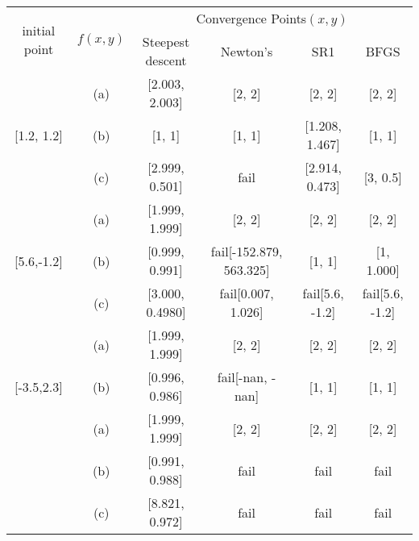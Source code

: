 \documentclass[../main.tex]{subfiles}
\begin{document}
\begin{center}
    \begin{tabular}{| c | c | c | c | c | c | } \hline
    \multirow{2}{*}{initial point}  & \multirow{2}{*}{$f(x, y)$}   & \multicolumn{4}{c|}{Convergence Points$(x, y)$} \\ \cline{3-6}
                                    &                              & Steepest descent & Newton's & SR1 & BFGS \\ \hline
    \multirow{3}{*}{[1.2, 1.2]}     & (a)                          & [2.003, 2.003]   & [2, 2]   & [2, 2] & [2, 2]  \\ 
                                    & (b)                          & [1, 1]           & [1, 1]   & [1.208, 1.467] & [1, 1] \\ 
                                    & (c)                          & [2.999, 0.501]   & fail     & [2.914, 0.473] & [3, 0.5]\\ \hline
    \multirow{3}{*}{[5.6,-1.2]}     & (a)                          & [1.999, 1.999]   & [2, 2] & [2, 2] & [2, 2] \\ 
                                    & (b)                          & [0.999, 0.991]   & fail[-152.879, 563.325] & [1, 1] & [1, 1.000] \\ 
                                    & (c)                          & [3.000, 0.4980]  & fail[0.007, 1.026] & fail[5.6, -1.2] & fail[5.6, -1.2] \\ \hline
    \multirow{3}{*}{[-3.5,2.3]}     & (a)                          & [1.999, 1.999]   & [2, 2] & [2, 2] & [2, 2] \\ 
                                    & (b)                          & [0.996, 0.986]   & fail[-nan, -nan] & [1, 1] & [1, 1] \\ \hline
    \multirow{3}{*}{[10.5,-8.3]}    & (a)                          & [1.999, 1.999]   & [2, 2] & [2, 2] & [2, 2] \\ 
                                    & (b)                          & [0.991, 0.988]   & fail & fail & fail \\ 
                                    & (c)                          & [8.821, 0.972]   & fail & fail & fail \\ \hline
                                    
    \end{tabular}
\end{center}
\end{document}
